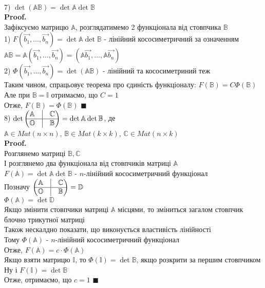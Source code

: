 \documentclass[a4paper, 14pt]{extarticle}
\def\proof{\textbf{Proof.}\\}
\def\bigline{\vspace{5mm}\\}
\def\qed{$\blacksquare$}
\begin{document}
\bigline
7) $\det (\mathbb{A} \mathbb{B}) = \det \mathbb{A} \det \mathbb{B}$\\
\proof
Зафіксуємо матрицю $\mathbb{A}$, розглядатимемо 2 функціонала від стовпчика $\mathbb{B}$\\
1) $F(\vec{b_1},\dots, \vec{b_n}) = \det \mathbb{A} \det \mathbb{B}$ - лінійний кососиметричний за означенням\\
$\mathbb{A}\mathbb{B} = \mathbb{A}(\vec{b_1},\dots, \vec{b_n}) = (\mathbb{A}\vec{b_1},\dots, \mathbb{A}\vec{b_n})$\\
2) $\Phi(\vec{b_1},\dots, \vec{b_n}) = \det(\mathbb{A}\mathbb{B})$ - лінійний та кососиметриний теж\\
Таким чином, спрацьовує теорема про єдиність функціоналу: $F(\mathbb{B}) = C \Phi(\mathbb{B})$\\
Але при $\mathbb{B} = \mathbb{I}$ отримаємо, що $C=1$\\
Отже, $F(\mathbb{B}) = \Phi(\mathbb{B})$ \qed
\bigline
8) $\det \begin{pmatrix}
 \mathbb{A} & \vline & \mathbb{C} \\
 \hline
 \mathbb{O} & \vline & \mathbb{B}
\end{pmatrix} = \det \mathbb{A} \det \mathbb{B}$, де \\$\mathbb{A} \in Mat(n \times n)$, $\mathbb{B} \in Mat(k \times k)$, $\mathbb{C} \in Mat(n \times k)$\\
\proof
Розглянемо матриці $\mathbb{B}, \mathbb{C}$\\
І розглянемо два функціонала від стовпчиків матриці $\mathbb{A}$\\
$F(\mathbb{A}) = \det \mathbb{A} \det \mathbb{B}$ - $n$-лінійний кососиметричний функціонал\\
Позначу $\begin{pmatrix}
 \mathbb{A} & \vline & \mathbb{C} \\
 \hline
 \mathbb{O} & \vline & \mathbb{B}
\end{pmatrix} = \mathbb{D}$\\
$\Phi(\mathbb{A}) = \det \mathbb{D}$\\
Якщо змінити стовпчики матриці $\mathbb{A}$ місцями, то зміниться загалом стовпчик блочно трикутної матриці\\
Також нескалдно показати, що виконується властивість лінійності\\
Тому $\Phi(\mathbb{A})$ - $n$-лінійний кососиметричний функціонал\\
Отже, $F(\mathbb{A}) = c \cdot \Phi(\mathbb{A})$\\
Якщо взяти матрицю $\mathbb{I}$, то $\Phi(\mathbb{I}) = \det \mathbb{B}$, якщо розкрити за першим стовпчиком\\
Ну і $F(\mathbb{I}) = \det \mathbb{B}$\\
Отже, отримаємо, що $c = 1$ \qed
\bigline
\end{document}
